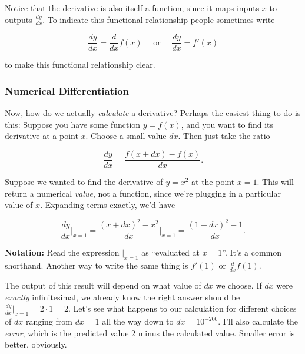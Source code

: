 \documentclass[
  letterpaper,
  DIV=11,
  numbers=noendperiod]{scrreprt}
\begin{document}
Notice that the derivative is also itself a function, since it maps
inputs \(x\) to outputs \(\frac{dy}{dx}\). To indicate this functional
relationship people sometimes write

\[\frac{dy}{dx}=\frac{d}{dx}f(x) \quad \text{ or } \quad \frac{dy}{dx}=f'(x)\]

to make this functional relationship clear.

\hypertarget{numerical-differentiation}{%
\subsubsection{Numerical
Differentiation}\label{numerical-differentiation}}

Now, how do we actually \emph{calculate} a derivative? Perhaps the
easiest thing to do is this: Suppose you have some function \(y=f(x)\),
and you want to find its derivative at a point \(x\). Choose a small
value \(dx\). Then just take the ratio

\[\frac{dy}{dx} = \frac{f(x+dx) - f(x)}{dx}.\]

Suppose we wanted to find the derivative of \(y=x^2\) at the point
\(x=1\). This will return a numerical \emph{value}, not a function,
since we're plugging in a particular value of \(x\). Expanding terms
exactly, we'd have

\[\frac{dy}{dx}\bigg|_{x=1} = \frac{(x+dx)^2 - x^2}{dx}\bigg|_{x=1} = \frac{(1+dx)^2 - 1}{dx}.\]

\textbf{Notation:} Read the expression \(|_{x=1}\) as ``evaluated at
\(x=1\)''. It's a common shorthand. Another way to write the same thing
is \(f'(1)\) or \(\frac{d}{dx}f(1)\).

The output of this result will depend on what value of \(dx\) we choose.
If \(dx\) were \emph{exactly} infinitesimal, we already know the right
answer should be \(\frac{dy}{dx}\big|_{x=1} = 2 \cdot 1 = 2\). Let's see
what happens to our calculation for different choices of \(dx\) ranging
from \(dx=1\) all the way down to \(dx=10^{-200}\). I'll also calculate
the \emph{error}, which is the predicted value \(2\) minus the
calculated value. Smaller error is better, obviously.
\end{document}
